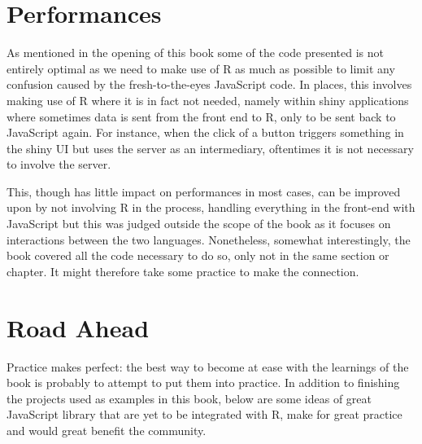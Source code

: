 \documentclass[
]{krantz}
\makeatletter
\newenvironment{Shaded}{\begin{snugshade}}{\end{snugshade}}
\newcommand{\AttributeTok}[1]{\textcolor[rgb]{0.61,0.61,0.61}{#1}}
\newcommand{\CommentTok}[1]{\textcolor[rgb]{0.37,0.37,0.37}{\textit{#1}}}
\newcommand{\KeywordTok}[1]{\textcolor[rgb]{0.27,0.27,0.27}{\textbf{#1}}}
\newcommand{\NormalTok}[1]{#1}
\newcommand{\OperatorTok}[1]{\textcolor[rgb]{0.43,0.43,0.43}{\textbf{#1}}}
\newcommand{\StringTok}[1]{\textcolor[rgb]{0.5,0.5,0.5}{#1}}
\newenvironment{kframe}{%
\medskip{}
\setlength{\fboxsep}{.8em}
 \def\at@end@of@kframe{}%
 \ifinner\ifhmode%
  \def\at@end@of@kframe{\end{minipage}}%
  \begin{minipage}{\columnwidth}%
 \fi\fi%
 \def\FrameCommand##1{\hskip\@totalleftmargin \hskip-\fboxsep
 \colorbox{shadecolor}{##1}\hskip-\fboxsep
     \hskip-\linewidth \hskip-\@totalleftmargin \hskip\columnwidth}%
 \MakeFramed {\advance\hsize-\width
   \@totalleftmargin\z@ \linewidth\hsize
   \@setminipage}}%
 {\par\unskip\endMakeFramed%
 \at@end@of@kframe}
\renewenvironment{Shaded}{\begin{kframe}}{\end{kframe}}
\makeatother
\begin{document}
\hypertarget{conclusion-performances}{%
\section{Performances}\label{conclusion-performances}}

As mentioned in the opening of this book some of the code presented is not entirely optimal as we need to make use of R as much as possible to limit any confusion caused by the fresh-to-the-eyes JavaScript code. In places, this involves making use of R where it is in fact not needed, namely within shiny applications where sometimes data is sent from the front end to R, only to be sent back to JavaScript again. For instance, when the click of a button triggers something in the shiny UI but uses the server as an intermediary, oftentimes it is not necessary to involve the server.

This, though has little impact on performances in most cases, can be improved upon by not involving R in the process, handling everything in the front-end with JavaScript but this was judged outside the scope of the book as it focuses on interactions between the two languages. Nonetheless, somewhat interestingly, the book covered all the code necessary to do so, only not in the same section or chapter. It might therefore take some practice to make the connection.

\begin{Shaded}
\end{Shaded}

\hypertarget{conclusion-ahead}{%
\section{Road Ahead}\label{conclusion-ahead}}

Practice makes perfect: the best way to become at ease with the learnings of the book is probably to attempt to put them into practice. In addition to finishing the projects used as examples in this book, below are some ideas of great JavaScript library that are yet to be integrated with R, make for great practice and would great benefit the community.
\end{document}
